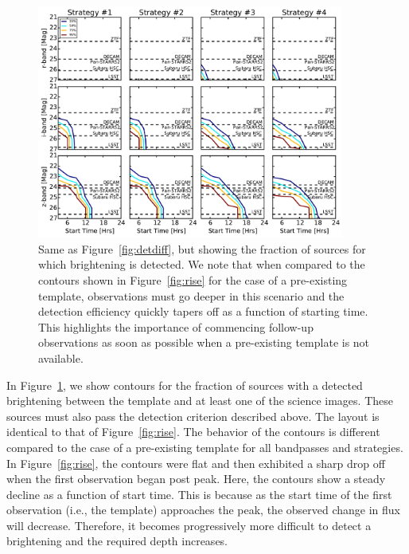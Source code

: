 \begin{figure}[t!]
\centering
\includegraphics[width=0.9\textwidth]{./figs/chapter2/ch2_f13.pdf}
\caption{Same as Figure~\ref{fig:detdiff}, but showing the fraction of sources for which brightening is detected. We note that when compared to the contours shown in Figure~\ref{fig:rise} for the case of a pre-existing template, observations must go deeper in this scenario and the detection efficiency quickly tapers off as a function of starting time. This highlights the importance of commencing follow-up observations as soon as possible when a pre-existing template is not available.}
\label{fig:risediff}
\end{figure}
   
In Figure~\ref{fig:risediff}, we show contours for the fraction of sources with a detected brightening between the template and at least one of the science images. These sources must also pass the detection criterion described above. The layout is identical to that of Figure~\ref{fig:rise}. The behavior of the contours is different compared to the case of a pre-existing template for all bandpasses and strategies. In Figure~\ref{fig:rise}, the contours were flat and then exhibited a sharp drop off when the first observation began post peak. Here, the contours show a steady decline as a function of start time. This is because as the start time of the first observation (i.e., the template) approaches the peak, the observed change in flux will decrease. Therefore, it becomes progressively more difficult to detect a brightening and the required depth increases.

